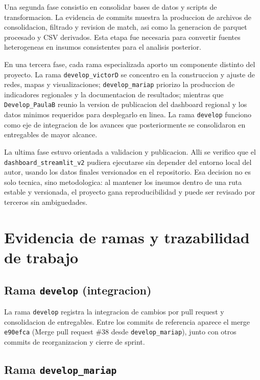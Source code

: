 \documentclass[12pt,letterpaper]{article}
\begin{document}
Una segunda fase consistio en consolidar bases de datos y scripts de transformacion. La evidencia de commits muestra la produccion de archivos de consolidacion, filtrado y revision de match, asi como la generacion de parquet procesado y CSV derivados. Esta etapa fue necesaria para convertir fuentes heterogeneas en insumos consistentes para el analisis posterior.

En una tercera fase, cada rama especializada aporto un componente distinto del proyecto. La rama \texttt{develop\_victorD} se concentro en la construccion y ajuste de redes, mapas y visualizaciones; \texttt{develop\_mariap} priorizo la produccion de indicadores regionales y la documentacion de resultados; mientras que \texttt{Develop\_PaulaB} reunio la version de publicacion del dashboard regional y los datos minimos requeridos para desplegarlo en linea. La rama \texttt{develop} funciono como eje de integracion de los avances que posteriormente se consolidaron en entregables de mayor alcance.

La ultima fase estuvo orientada a validacion y publicacion. Alli se verifico que el \texttt{dashboard\_streamlit\_v2} pudiera ejecutarse sin depender del entorno local del autor, usando los datos finales versionados en el repositorio. Esa decision no es solo tecnica, sino metodologica: al mantener los insumos dentro de una ruta estable y versionada, el proyecto gana reproducibilidad y puede ser revisado por terceros sin ambiguedades.

\section{Evidencia de ramas y trazabilidad de trabajo}

\subsection{Rama \texttt{develop} (integracion)}

La rama \texttt{develop} registra la integracion de cambios por pull request y consolidacion de entregables. Entre los commits de referencia aparece el merge \texttt{e90efca} (Merge pull request \#38 desde \texttt{develop\_mariap}), junto con otros commits de reorganizacion y cierre de sprint.

\subsection{Rama \texttt{develop\_mariap}}
\end{document}
